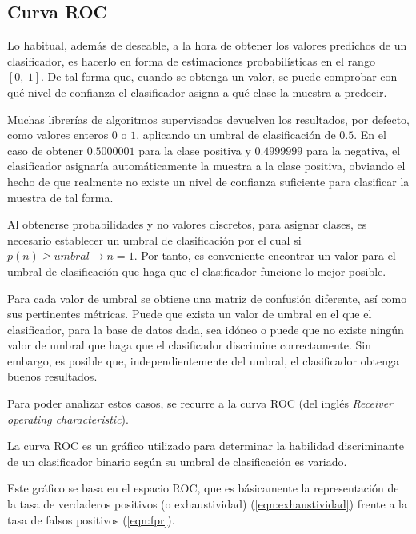 \subsection{Curva ROC} \label{subsection:ROC_curva}

Lo habitual, además de deseable, a la hora de obtener los valores predichos de un clasificador, es hacerlo en forma de estimaciones probabilísticas en el rango $[0,\:1]$. De tal forma que, cuando se obtenga un valor, se puede comprobar con qué nivel de confianza el clasificador asigna a qué clase la muestra a predecir.

Muchas librerías de algoritmos supervisados devuelven los resultados, por defecto, como valores enteros $0$ o $1$, aplicando un umbral de clasificación de $0.5$. En el caso de obtener $0.5000001$ para la clase positiva y $0.4999999$ para la negativa, el clasificador asignaría automáticamente la muestra a la clase positiva, obviando el hecho de que realmente no existe un nivel de confianza suficiente para clasificar la muestra de tal forma.

Al obtenerse probabilidades y no valores discretos, para asignar clases, es necesario establecer un umbral de clasificación por el cual si $p(n) \geq umbral \rightarrow n = 1$. Por tanto, es conveniente encontrar un valor para el umbral de clasificación que haga que el clasificador funcione lo mejor posible.

Para cada valor de umbral se obtiene una matriz de confusión diferente, así como sus pertinentes métricas. Puede que exista un valor de umbral en el que el clasificador, para la base de datos dada, sea idóneo o puede que no existe ningún valor de umbral que haga que el clasificador discrimine correctamente. Sin embargo, es posible que, independientemente del umbral, el clasificador obtenga buenos resultados.

Para poder analizar estos casos, se recurre a la curva ROC (del inglés \textit{Receiver operating characteristic}).

La curva ROC es un gráfico utilizado para determinar la habilidad discriminante de un clasificador binario según su umbral de clasificación es variado.

Este gráfico se basa en el espacio ROC, que es básicamente la representación de la tasa de verdaderos positivos (o exhaustividad) (\ref{eqn:exhaustividad}) frente a la tasa de falsos positivos (\ref{eqn:fpr}).


